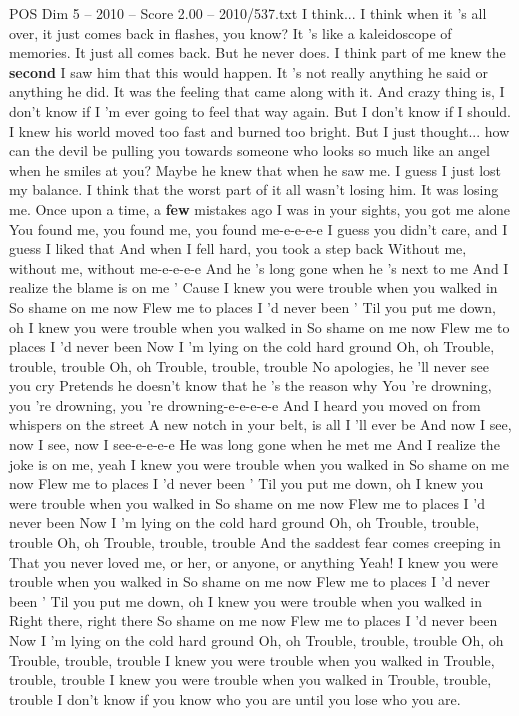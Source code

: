 \begin{textsample}{POS Dim 5 – 2010 – Score 2.00 – 2010/537.txt}  \label{ex:f5_pos_032}
I think...
I think when it 's all over, it just comes back in flashes, you know?
It 's like a kaleidoscope of memories.
It just all comes back.
But he never does.
I think part of me knew the \textbf{second} I saw him that this would happen.
It 's not really anything he said or anything he did.
It was the feeling that came along with it.
And crazy thing is, I don't know if I 'm ever going to feel that way again.
But I don't know if I should.
I knew his world moved too fast and burned too bright.
But I just thought... how can the devil be pulling you towards someone who looks so much like an angel when he smiles at you?
Maybe he knew that when he saw me.
I guess I just lost my balance.
I think that the worst part of it all wasn't losing him.
It was losing me.
Once upon a time, a \textbf{few} mistakes ago I was in your sights, you got me alone You found me, you found me, you found me-e-e-e-e I guess you didn't care, and I guess I liked that And when I fell hard, you took a step back Without me, without me, without me-e-e-e-e And he 's long gone when he 's next to me And I realize the blame is on me ' Cause I knew you were trouble when you walked in So shame on me now Flew me to places I 'd never been ' Til you put me down, oh I knew you were trouble when you walked in So shame on me now Flew me to places I 'd never been Now I 'm lying on the cold hard ground Oh, oh Trouble, trouble, trouble Oh, oh Trouble, trouble, trouble No apologies, he 'll never see you cry Pretends he doesn't know that he 's the reason why You 're drowning, you 're drowning, you 're drowning-e-e-e-e-e And I heard you moved on from whispers on the street A new notch in your belt, is all I 'll ever be And now I see, now I see, now I see-e-e-e-e He was long gone when he met me And I realize the joke is on me, yeah I knew you were trouble when you walked in So shame on me now Flew me to places I 'd never been ' Til you put me down, oh I knew you were trouble when you walked in So shame on me now Flew me to places I 'd never been Now I 'm lying on the cold hard ground Oh, oh Trouble, trouble, trouble Oh, oh Trouble, trouble, trouble And the saddest fear comes creeping in That you never loved me, or her, or anyone, or anything Yeah!
I knew you were trouble when you walked in So shame on me now Flew me to places I 'd never been ' Til you put me down, oh I knew you were trouble when you walked in Right there, right there So shame on me now Flew me to places I 'd never been Now I 'm lying on the cold hard ground Oh, oh Trouble, trouble, trouble Oh, oh Trouble, trouble, trouble I knew you were trouble when you walked in Trouble, trouble, trouble I knew you were trouble when you walked in Trouble, trouble, trouble I don't know if you know who you are until you lose who you are.

\end{textsample}

